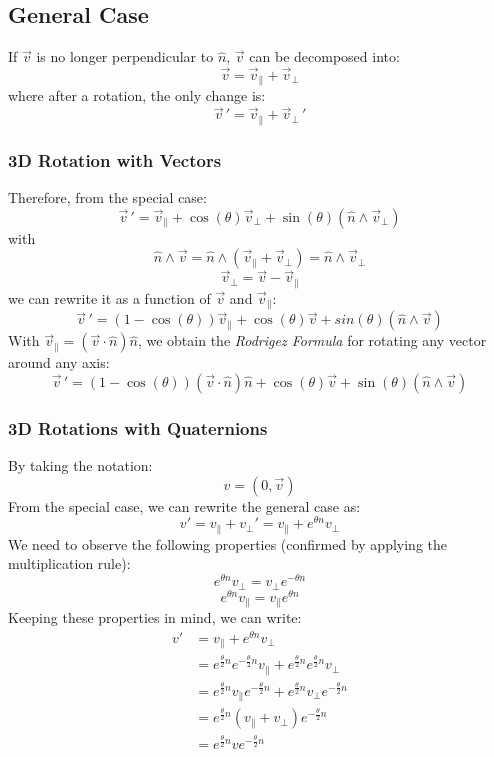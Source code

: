 \documentclass[10pt,a4paper]{article}
\begin{document}
\subsection{General Case}
If $\vec{v}$ is no longer perpendicular to $\hat{n}$, $\vec{v}$ can be decomposed into:
$$
\vec{v} = \vec{v}_\parallel + \vec{v}_\perp
$$
where after a rotation, the only change is:
$$
\vec{v}\,' = \vec{v}_\parallel + \vec{v}_\perp\,'
$$
\subsubsection{3D Rotation with Vectors}
Therefore, from the special case:
$$
\vec{v}\,' = \vec{v}_\parallel + \cos(\theta)\vec{v}_\perp + \sin(\theta)(\hat{n}\wedge\vec{v}_\perp)
$$
with
$$
\hat{n}\wedge\vec{v} = \hat{n}\wedge(\vec{v}_\parallel + \vec{v}_\perp) = \hat{n}\wedge\vec{v}_\perp
$$
$$
\vec{v}_\perp = \vec{v} - \vec{v}_\parallel
$$
we can rewrite it as a function of $\vec{v}$ and $\vec{v}_\parallel$:
$$
\vec{v}\,' = (1-\cos(\theta))\vec{v}_\parallel + \cos(\theta)\vec{v} + sin(\theta)(\hat{n}\wedge\vec{v})
$$
With $\vec{v}_\parallel = (\vec{v}\cdot \hat{n})\hat{n}$, we obtain the \emph{Rodrigez Formula} for rotating any vector around any axis:
$$
\boxed{
\vec{v}\,' = (1-\cos(\theta))(\vec{v}\cdot \hat{n})\hat{n} + \cos(\theta)\vec{v} + \sin(\theta)(\hat{n}\wedge\vec{v})
}
$$

\subsubsection{3D Rotations with Quaternions}
By taking the notation:
$$
v = (0,\vec{v})
$$
From the special case, we can rewrite the general case as:
$$
v' = v_\parallel + v_\perp' = v_\parallel + e^{\theta n}v_\perp
$$
We need to observe the following properties (confirmed by applying the multiplication rule): 
$$
e^{\theta n}v_\perp = v_\perp e^{-\theta n} 
$$
$$ e^{\theta n}v_\parallel = v_\parallel e^{\theta n}
$$
Keeping these properties in mind, we can write:
\begin{equation*}
\begin{aligned}
v' &= v_\parallel + e^{\theta n}v_\perp \\
&= e^{\frac{\theta}{2}n}e^{-\frac{\theta}{2}n} v_\parallel + e^{\frac{\theta}{2}n}e^{\frac{\theta}{2}n} v_\perp \\
&= e^{\frac{\theta}{2}n} v_\parallel e^{-\frac{\theta}{2}n} + e^{\frac{\theta}{2}n} v_\perp e^{-\frac{\theta}{2}n} \\
&= e^{\frac{\theta}{2}n} (v_\parallel + v_\perp) e^{-\frac{\theta}{2}n} \\
&= e^{\frac{\theta}{2}n} v e^{-\frac{\theta}{2}n}
\end{aligned}
\end{equation*}
\end{document}
